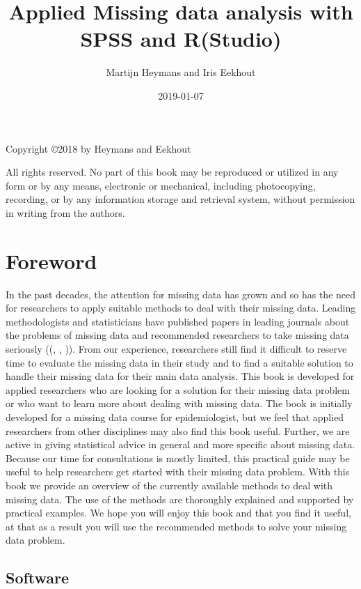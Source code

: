 \documentclass[]{book}
\title{Applied Missing data analysis with SPSS and R(Studio)}
\author{Martijn Heymans and Iris Eekhout}
\date{2019-01-07}
\begin{document}
\maketitle

{
\setcounter{tocdepth}{1}
\tableofcontents
}
Copyright ©2018 by Heymans and Eekhout

All rights reserved. No part of this book may be reproduced or utilized
in any form or by any means, electronic or mechanical, including
photocopying, recording, or by any information storage and retrieval
system, without permission in writing from the authors.

\chapter*{Foreword}\label{foreword}

In the past decades, the attention for missing data has grown and so has
the need for researchers to apply suitable methods to deal with their
missing data. Leading methodologists and statisticians have published
papers in leading journals about the problems of missing data and
recommended researchers to take missing data seriously
((\citet{sterne2009multiple}, \citet{little2012prevention},
\citet{Li2015})). From our experience, researchers still find it
difficult to reserve time to evaluate the missing data in their study
and to find a suitable solution to handle their missing data for their
main data analysis. This book is developed for applied researchers who
are looking for a solution for their missing data problem or who want to
learn more about dealing with missing data. The book is initially
developed for a missing data course for epidemiologist, but we feel that
applied researchers from other disciplines may also find this book
useful. Further, we are active in giving statistical advice in general
and more specific about missing data. Because our time for consultations
is mostly limited, this practical guide may be useful to help
researchers get started with their missing data problem. With this book
we provide an overview of the currently available methods to deal with
missing data. The use of the methods are thoroughly explained and
supported by practical examples. We hope you will enjoy this book and
that you find it useful, at that as a result you will use the
recommended methods to solve your missing data problem.

\section{Software}\label{software}
\end{document}
